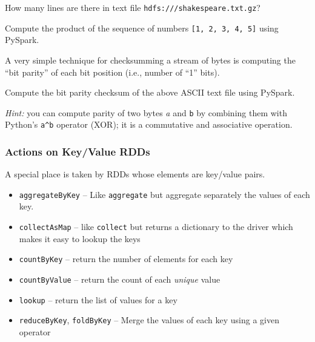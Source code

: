 \documentclass[english,serif,mathserif]{beamer}
\begin{document}
\begin{frame}[fragile]
  \small

  \begin{exercise*}[2.A]
    How many lines are there in text file \texttt{hdfs:///shakespeare.txt.gz}?
  \end{exercise*}

  \+
  \begin{exercise*}[2.B]
    Compute the product of the sequence of numbers \texttt{[1, 2, 3,
      4, 5]} using PySpark.
  \end{exercise*}

  \+
  \begin{exercise*}
    A very simple technique for checksumming a stream of bytes is
    computing the ``bit parity'' of each bit position (i.e., number of
    ``1'' bits).

    \+
    Compute the bit parity checksum of the above ASCII text file using PySpark.

    \+
    \emph{Hint:} you can compute parity of two bytes \emph{a} and
    \texttt{b} by combining them with Python's \lstinline|a^b|
    operator (XOR); it is a commutative and associative operation.
  \end{exercise*}
\end{frame}


\begin{frame}[fragile]
  \frametitle{Actions on Key/Value RDDs}

  A special place is taken by RDDs whose elements are key/value pairs.

  \+\small
\begin{itemize}
\item \lstinline!aggregateByKey! -- Like \lstinline!aggregate! but
  aggregate separately the values of each key.
\item
  \lstinline!collectAsMap! -- like \lstinline!collect! but returns a
  dictionary to the driver which makes it easy to lookup the keys
\item
  \lstinline!countByKey! -- return the number of elements for each key
\item
  \lstinline!countByValue! -- return the count of each \emph{unique} value
\item
  \lstinline!lookup! -- return the list of values for a key
\item
  \lstinline!reduceByKey!, \texttt{foldByKey}
  -- Merge the values of each key using a given operator
\end{itemize}
\end{frame}
\end{document}
